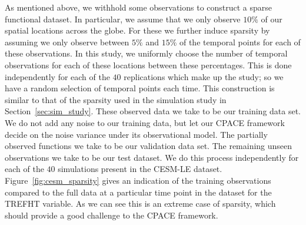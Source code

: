 As mentioned above, we withhold some observations to construct a sparse functional dataset. 
In particular, we assume that we only observe $10\%$ of our spatial locations across the globe.
For these we further induce sparsity by assuming we only observe between $5\%$ and $15\%$ of the temporal points for each of these observations.
In this study, we uniformly choose the number of temporal observations for each of these locations between these percentages.
This is done independently for each of the $40$ replications which make up the study; so we have a random selection of temporal points each time. 
This construction is similar to that of the sparsity used in the simulation study in Section~\ref{sec:sim_study}.
These observed data we take to be our training data set.
We do not add any noise to our training data, but let our CPACE framework decide on the noise variance under its observational model.
The partially observed functions we take to be our validation data set.
The remaining unseen observations we take to be our test dataset.
We do this process independently for each of the $40$ simulations present in the CESM-LE dataset.
Figure~\ref{fig:cesm_sparsity} gives an indication of the training observations compared to the full data at a particular time point in the dataset for the TREFHT variable.
As we can see this is an extreme case of sparsity, which should provide a good challenge to the CPACE framework.

